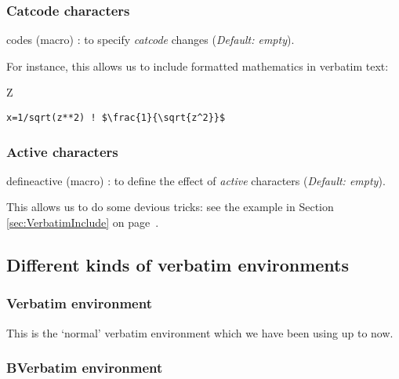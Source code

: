 \documentclass{article}
\providecommand\optname[1]{\textsf{#1}}
\newenvironment{optlist}{\begin{description}%
  \renewcommand\makelabel[1]{%
    \descriptionlabel{\mdseries\optname{##1}}}%
  \itemsep0.25\itemsep}%
 {\end{description}}
\begin{document}
\subsubsection{Catcode characters}

\begin{optlist}
  \item[codes (macro)]: to specify \emph{catcode} changes (\emph{Default:
  empty}).
\end{optlist}

  For instance, this allows us to include formatted mathematics in verbatim
text:

{
\begin{SideBySideExample}
  Z
  \begin{Verbatim}[commandchars=\\\{\},
         codes={\catcode`$=3\catcode`^=7}]
    x=1/sqrt(z**2) ! $\frac{1}{\sqrt{z^2}}$
  \end{Verbatim}
\end{SideBySideExample}
}  %


\subsubsection{Active characters}

\begin{optlist}
  \item[defineactive (macro)]: to define the effect of \emph{active}
  characters
  (\emph{Default: empty}).
\end{optlist}

  This allows us to do some devious tricks: see the example in Section
\ref{sec:VerbatimInclude} on page~\pageref{sec:VerbatimInclude}.

\subsection{Different kinds of verbatim environments}

\subsubsection{Verbatim environment}

  This is the `normal' verbatim environment which we have been using up to
now.

\subsubsection{BVerbatim environment}
\end{document}
